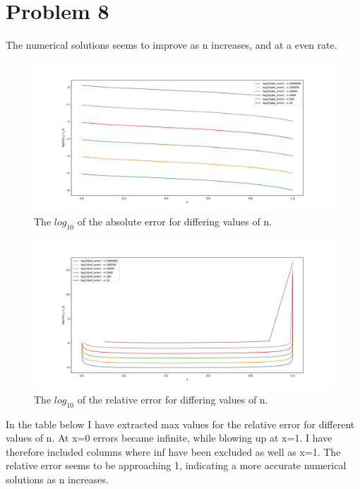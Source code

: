 \documentclass[english,notitlepage]{revtex4-1}  %
\begin{document}
\section{Problem 8}
The numerical solutions seems to improve as n increases, and at a even rate. 
\begin{figure}[H]
	\centering
	\includegraphics[scale=0.5]{../Figures/problem8_abs_error.pdf}
	\caption{The $log_{10}$ of the absolute error for differing values of n.}
\end{figure}
\begin{figure}[H]
	\centering
	\includegraphics[scale=0.5]{../Figures/problem8_rel_error.pdf}
	\caption{The $log_{10}$ of the relative error for differing values of n.}
\end{figure}
In the table below I have extracted max values for the relative error for different values of n. At x=0 errors became infinite, while blowing up at x=1. I have therefore included columns where inf have been excluded as well as x=1. 
The relative error seems to be approaching 1, indicating a more accurate numerical solutions as n increases. 
\end{document}
